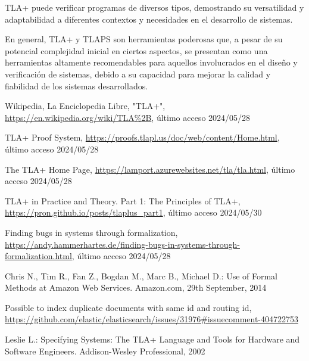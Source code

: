 \documentclass[runningheads]{llncs}
\begin{document}
TLA+ puede verificar programas de diversos tipos, demostrando su versatilidad y adaptabilidad a diferentes contextos y necesidades en el desarrollo de sistemas.

En general, TLA+ y TLAPS son herramientas poderosas que, a pesar de su potencial complejidad inicial en ciertos aspectos, se presentan como una herramientas altamente recomendables para aquellos involucrados en el diseño y verificación de sistemas, debido a su capacidad para mejorar la calidad y fiabilidad de los sistemas desarrollados. 





\begin{thebibliography}{8}
Wikipedia, La Enciclopedia Libre, "TLA+", \url{https://en.wikipedia.org/wiki/TLA%2B}, último acceso 2024/05/28

TLA+ Proof System, \url{https://proofs.tlapl.us/doc/web/content/Home.html}, último acceso 2024/05/28

The TLA+ Home Page, \url{https://lamport.azurewebsites.net/tla/tla.html}, último acceso 2024/05/28

TLA+ in Practice and Theory. Part 1: The Principles of TLA+, \url{https://pron.github.io/posts/tlaplus_part1}, último acceso 2024/05/30

Finding bugs in systems through formalization, \url{https://andy.hammerhartes.de/finding-bugs-in-systems-through-formalization.html}, último acceso 2024/05/28

Chris N., Tim R., Fan Z., Bogdan M., Marc B., Michael D.: Use of Formal Methods at Amazon Web Services. Amazon.com, 29th September, 2014

Possible to index duplicate documents with same id and routing id, \url{https://github.com/elastic/elasticsearch/issues/31976#issuecomment-404722753}

Leslie L.: Specifying Systems: The TLA+ Language and Tools for Hardware and Software Engineers. Addison-Wesley Professional, 2002

\end{thebibliography}
\end{document}
